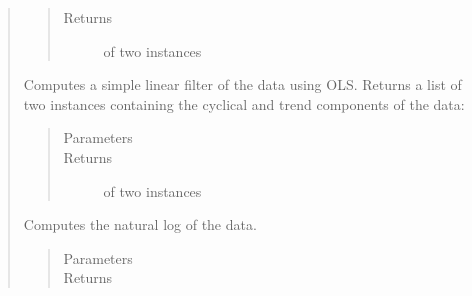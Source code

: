 \documentclass[letterpaper,10pt,openany,oneside,english]{sphinxmanual}
\begin{document}
\begin{fulllineitems}
\begin{quote}
\begin{fulllineitems}
\begin{quote}
\begin{description}
\item[{Returns}] \leavevmode
\href{https://docs.python.org/2/library/functions.html\#list}{} of two {\hyperref[\detokenize{series_class:fredpy.series}]{}} instances

\end{description}\end{quote}

\end{fulllineitems}


\begin{fulllineitems}
\label{\detokenize{series_class:fredpy.series.lintrend}}
Computes a simple linear filter of the data using OLS. Returns a list of two {\hyperref[\detokenize{series_class:fredpy.series}]{}} instances containing the cyclical and trend components of the data:
\begin{quote}

\end{quote}
\begin{quote}\begin{description}
\item[{Parameters}] \leavevmode
\item[{Returns}] \leavevmode
\href{https://docs.python.org/2/library/functions.html\#list}{} of two {\hyperref[\detokenize{series_class:fredpy.series}]{}} instances

\end{description}\end{quote}

\end{fulllineitems}


\begin{fulllineitems}
\label{\detokenize{series_class:fredpy.series.log}}
Computes the natural log of the data.
\begin{quote}\begin{description}
\item[{Parameters}] \leavevmode
\item[{Returns}] \leavevmode
{\hyperref[\detokenize{series_class:fredpy.series}]{}}


\end{description}
\end{quote}
\end{fulllineitems}
\end{quote}
\end{fulllineitems}
\end{document}
